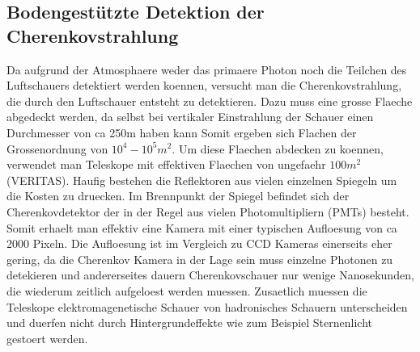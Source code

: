 \subsection{Bodengestützte Detektion der Cherenkovstrahlung}
Da aufgrund der Atmosphaere weder das primaere Photon noch die Teilchen des Luftschauers detektiert werden koennen, versucht man die Cherenkovstrahlung, die durch den Luftschauer entsteht zu detektieren. Dazu muss eine grosse Flaeche abgedeckt werden, da selbst bei vertikaler Einstrahlung der Schauer einen Durchmesser von ca 250m haben kann %
Somit ergeben sich Flachen der Grossenordnung von $10^4-10^5 m^2$. Um diese Flaechen abdecken zu koennen, verwendet man Teleskope mit effektiven Flaechen von ungefaehr $100 m^2$ (VERITAS). Haufig bestehen die Reflektoren aus vielen einzelnen Spiegeln um die Kosten zu druecken. Im Brennpunkt der Spiegel befindet sich der Cherenkovdetektor der in der Regel aus vielen Photomultipliern (PMTs) besteht. Somit erhaelt man effektiv eine Kamera mit einer typischen Aufloesung von ca 2000 Pixeln. Die Aufloesung ist im Vergleich zu CCD Kameras einerseits eher gering, da die Cherenkov Kamera in der Lage sein muss einzelne Photonen zu detekieren und andererseites dauern Cherenkovschauer nur wenige Nanosekunden, die wiederum zeitlich aufgeloest werden muessen. Zusaetlich muessen die Teleskope elektromagenetische Schauer von hadronisches Schauern unterscheiden und duerfen nicht durch Hintergrundeffekte wie zum Beispiel Sternenlicht gestoert werden.
